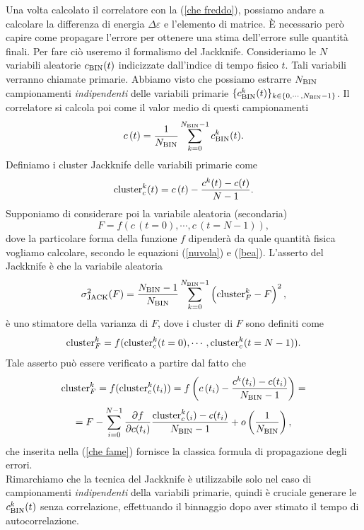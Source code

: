 \documentclass{article}
\begin{document}
Una volta calcolato il correlatore con la (\ref{che freddo}), possiamo andare a calcolare la differenza di energia $\Delta \varepsilon$ e l'elemento di matrice. È necessario però capire come propagare l'errore per ottenere una stima dell'errore sulle quantità finali. Per fare ciò useremo il formalismo del Jackknife. Consideriamo le $N$ variabili aleatorie $c_{\textup{BIN}}(t)$ indicizzate dall'indice di tempo fisico $t$. Tali variabili verranno chiamate primarie. Abbiamo visto che possiamo estrarre $N_{\textup{BIN}}$ campionamenti \textit{indipendenti} delle variabili primarie $\{c_{\textup{BIN}}^k(t)\}_{k\in \{0,\cdots, N_{\textup{BIN}}-1\}}$. Il correlatore si calcola poi come il valor medio di questi campionamenti
\begin{equation}
    c\,(t)=\frac{1}{N_{\textup{BIN}}}\sum_{k=0}^{N_{\textup{BIN}}-1} c_{\textup{BIN}}^k(t).
\end{equation}
Definiamo i cluster Jackknife delle variabili primarie come 
\begin{equation}
    \textup{cluster}_c^k(t)=c\,(t)-\frac{c^k(t)-c(t)}{N-1}.
\end{equation}
Supponiamo di considerare poi la variabile aleatoria (secondaria)
\begin{equation}
    F=f(c\,(t=0), \cdots, c\,(t=N-1)),
\end{equation}
dove la particolare forma della funzione $f$ dipenderà da quale quantità fisica vogliamo calcolare, secondo le equazioni (\ref{nuvola}) e (\ref{bea}). 
L'asserto del Jackknife è che la variabile aleatoria
\begin{equation}
    \label{che fame}
    \sigma^2_{\mathrm{JACK}}({F})=\frac{N_{\textup{BIN}}-1}{N_{\textup{BIN}}}\sum_{k=0}^{N_{\textup{BIN}}-1}\left(\textup{cluster}^k_F-{F}\right)^2,
\end{equation}
è uno stimatore della varianza di $F$, dove i cluster di $F$ sono definiti come 
\begin{equation}
    \textup{cluster}^k_F=f(\textup{cluster}_c^k(t=0), \cdots, \textup{cluster}_c^k(t=N-1)).
\end{equation}
Tale asserto può essere verificato a partire dal fatto che 
$$\textup{cluster}^k_F=f(\textup{cluster}_c^k(t_i))
=f\left(c\,(t_i)-\frac{c^k(t_i)-c(t_i)}{N_{\textup{BIN}}-1}\right)=$$
$$=F-\sum_{i=0}^{N-1}\frac{\partial f}{\partial c(t_i)}\frac{\textup{cluster}_c^k(_i)-c(t_i)}{N_{\textup{BIN}}-1}+o\left(\frac{1}{N_{\textup{BIN}}}\right), $$
che inserita nella (\ref{che fame}) fornisce la classica formula di propagazione degli errori. \\
Rimarchiamo che la tecnica del Jackknife è utilizzabile solo nel caso di campionamenti \textit{indipendenti} della variabili primarie, quindi è cruciale generare le $c_{\textup{BIN}}^k(t)$ senza correlazione, effettuando il binnaggio dopo aver stimato il tempo di autocorrelazione.
\end{document}
